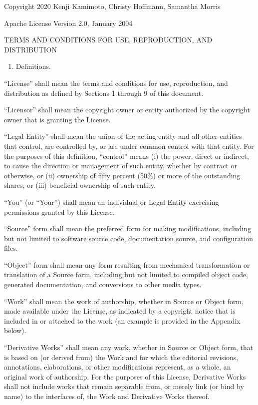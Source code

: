 \documentclass[letterpaper,10pt,english]{sphinxmanual}
\begin{document}
Copyright 2020 Kenji Kamimoto, Christy Hoffmann, Samantha Morris

Apache License
Version 2.0, January 2004

TERMS AND CONDITIONS FOR USE, REPRODUCTION, AND DISTRIBUTION
\begin{enumerate}
\def\theenumi{\arabic{enumi}}
\def\labelenumi{\theenumi .}
\makeatletter\def\p@enumii{\p@enumi \theenumi .}\makeatother
\item {} 
Definitions.

\end{enumerate}

“License” shall mean the terms and conditions for use, reproduction,
and distribution as defined by Sections 1 through 9 of this document.

“Licensor” shall mean the copyright owner or entity authorized by
the copyright owner that is granting the License.

“Legal Entity” shall mean the union of the acting entity and all
other entities that control, are controlled by, or are under common
control with that entity. For the purposes of this definition,
“control” means (i) the power, direct or indirect, to cause the
direction or management of such entity, whether by contract or
otherwise, or (ii) ownership of fifty percent (50\%) or more of the
outstanding shares, or (iii) beneficial ownership of such entity.

“You” (or “Your”) shall mean an individual or Legal Entity
exercising permissions granted by this License.

“Source” form shall mean the preferred form for making modifications,
including but not limited to software source code, documentation
source, and configuration files.

“Object” form shall mean any form resulting from mechanical
transformation or translation of a Source form, including but
not limited to compiled object code, generated documentation,
and conversions to other media types.

“Work” shall mean the work of authorship, whether in Source or
Object form, made available under the License, as indicated by a
copyright notice that is included in or attached to the work
(an example is provided in the Appendix below).

“Derivative Works” shall mean any work, whether in Source or Object
form, that is based on (or derived from) the Work and for which the
editorial revisions, annotations, elaborations, or other modifications
represent, as a whole, an original work of authorship. For the purposes
of this License, Derivative Works shall not include works that remain
separable from, or merely link (or bind by name) to the interfaces of,
the Work and Derivative Works thereof.
\end{document}

